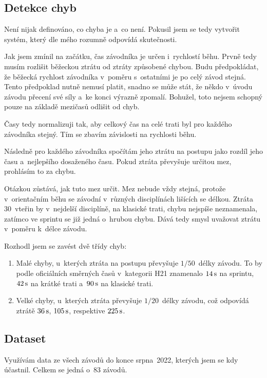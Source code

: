 \documentclass[a4paper,11pt]{article}
\begin{document}
\subsection*{Detekce chyb}

Není nijak definováno, co chyba je a~co není. Pokusil jsem se tedy vytvořit
systém, který dle mého rozumně odpovídá skutečnosti.

Jak jsem zmínil na začátku, čas závodníka je určen i~rychlostí běhu. Prvně tedy
musím rozlišit běžeckou ztrátu od ztráty způsobené chybou. Budu předpokládat, že
běžecká rychlost závodníka v~poměru s~ostatními je po celý závod stejná.
Tento předpoklad nutně nemusí platit, snadno se může stát, že někdo v~úvodu
závodu přecení své síly a~ke konci výrazně zpomalí. Bohužel, toto nejsem schopný
pouze na základě mezičasů odlišit od chyb.

Časy tedy normalizuji tak, aby celkový čas na celé trati byl pro každého
závodníka stejný. Tím se zbavím závislosti na rychlosti běhu.

Následně pro každého závodníka spočítám jeho ztrátu na postupu jako rozdíl jeho
času a~nejlepšího dosaženého času. Pokud ztráta převyšuje určitou mez, prohlásím
to za chybu.

Otázkou zůstává, jak tuto mez určit. Mez nebude vždy stejná, protože
v~orientačním běhu se závodní v~různých disciplínách lišících se délkou. Ztráta
30~vteřin by v~nejdelší disciplíně, na klasické trati, chybu nejspíše
neznamenala, zatímco ve sprintu se již jedná o~hrubou chybu. Dává tedy smysl
uvažovat ztrátu v~poměru k~délce závodu.

Rozhodl jsem se zavést dvě třídy chyb:
\begin{enumerate}
    \item Malé chyby, u~kterých ztráta na postupu převyšuje $1/50$~délky závodu.
          To by podle oficiálních směrných časů v~kategorii H21 znamenalo $14\,\rm s$
          na sprintu, $42\,\rm s$ na krátké trati a~$90\,\rm s$ na klasické trati.
    \item Velké chyby, u~kterých ztráta převyšuje $1/20$~délky závodu, což
          odpovídá ztrátě $36\,\rm s$, $105\,\rm s$, respektive $225\,\rm s$.
\end{enumerate}

\subsection*{Dataset}

Využívám data ze všech závodů do konce srpna~2022, kterých jsem se kdy účastnil.
Celkem se jedná o~83 závodů.
\end{document}
